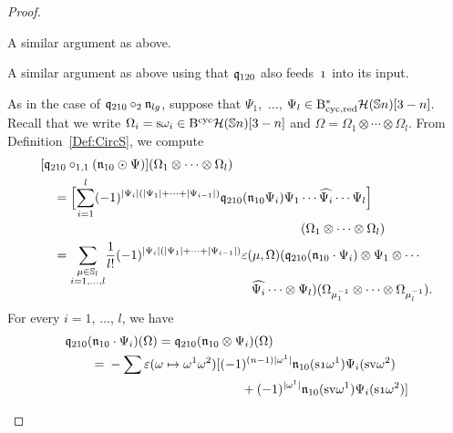 \documentclass[\MainFolder/Text.tex]{subfiles}
\begin{document}
\begin{proof}
\begin{description}[font=\normalfont\itshape]
\item[$\OPQ_{210}\circ_{1,1}(\PMC_{l_1 g_1} \odot \PMC_{l_2 g_2})$, $(l_i,g_i) \neq (1,0)$:] A similar argument as above.
\item[$\OPQ_{120}\circ_1 \PMC_{lg}$, $(l,g)\neq(1,0)$:] A similar argument as above using that $\mathfrak{q}_{120}$ also feeds~$\NOne$ into its input. 
\item[$\OPQ_{210}\circ_{1,1} (\PMC_{10}\odot \PMC_{lg})$, $(l,g)\neq (1,0)$:] 
As in the case of $\mathfrak{q}_{210}\circ_2 \mathfrak{n}_{lg}$, suppose that $\Psi_1$,~$\dotsc$, $\Psi_l \in \mathrm{B}_{\mathrm{cyc},\mathrm{red}}^*\mathcal{H}(\mathbb{S}{n})[3-n]$. Recall that we write $\Omega_i = \mathrm{s} \omega_i \in \mathrm{B}^{\mathrm{cyc}} \mathcal{H}(\mathbb{S}{n})[3-n]$ and $\Omega = \Omega_1\otimes \dotsb \otimes \Omega_l$. From Definition~\ref{Def:CircS}, we compute
\begin{align*}
&[\OPQ_{210} \circ_{1,1}(\PMC_{10}\odot \Psi)](\Omega_1 \otimes \dotsb \otimes \Omega_l) 
\\ &\quad = \begin{multlined}[t] \Bigl[ \sum_{i=1}^l (-1)^{\Abs{\Psi_i}(\Abs{\Psi_1} + \dotsb + \Abs{\Psi_{i-1}})} \OPQ_{210}(\PMC_{10}\Psi_i)\Psi_1\cdots \widehat{\Psi_i}\cdots \Psi_l\Bigr]\\ (\Omega_1 \otimes \dotsb \otimes \Omega_l) \end{multlined} \\ 
 &\quad = \begin{multlined}[t] \vphantom{\sum_{i}}\smash{\sum_{\substack{\mu \in \Perm_l \\ i=1, \dotsc, l}}} \frac{1}{l!} (-1)^{\Abs{\Psi_i}(\Abs{\Psi_1} + \dotsb + \Abs{\Psi_{i-1}})} \varepsilon(\mu,\Omega) (\OPQ_{210}(\PMC_{10}\cdot\Psi_i)\otimes \Psi_1\otimes \dotsb \\ \widehat{\Psi_i}\dotsb\otimes \Psi_l)(\Omega_{\mu_1^{-1}} \otimes \dotsb \otimes \Omega_{\mu_l^{-1}}). \end{multlined}
\end{align*}
For every $i=1$, $\dotsc$, $l$, we have
 \begin{align*} 
 & \OPQ_{210}(\PMC_{10}\cdot \Psi_i)(\Omega) = \OPQ_{210}(\PMC_{10}\otimes \Psi_i)(\Omega) \\
 & \qquad = \begin{multlined}[t]- \sum \varepsilon(\omega\mapsto \omega^1 \omega^2)[(-1)^{(n-1)\Abs{\omega^1}} \PMC_{10}(\Susp \NOne \omega^1) \Psi_i(\Susp \NVol \omega^2) \\ {}+ (-1)^{\Abs{\omega^1}} \PMC_{10}(\Susp \NVol \omega^1) \Psi_i(\Susp \NOne \omega^2)] \end{multlined} \\ 

\end{align*}
\end{description}
\end{proof}
\end{document}
